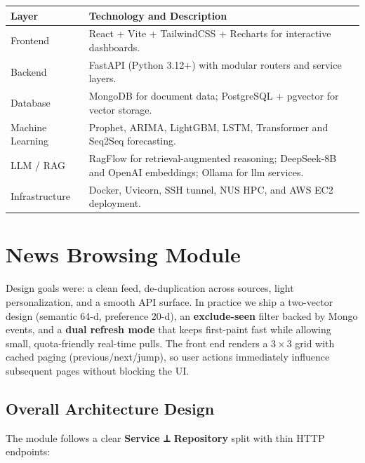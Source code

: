 \begin{longtable}{p{3cm}p{11cm}}
\toprule
\textbf{Layer} & \textbf{Technology and Description} \\
\midrule
Frontend & React + Vite + TailwindCSS + Recharts for interactive dashboards. \\
Backend & FastAPI (Python 3.12+) with modular routers and service layers. \\
Database & MongoDB for document data; PostgreSQL + pgvector for vector storage. \\
Machine Learning & Prophet, ARIMA, LightGBM, LSTM, Transformer and Seq2Seq forecasting. \\
LLM / RAG & RagFlow for retrieval-augmented reasoning; DeepSeek-8B and OpenAI embeddings; Ollama for llm services. \\
Infrastructure & Docker, Uvicorn, SSH tunnel, NUS \acs{HPC}, and AWS EC2 deployment. \\
\bottomrule
\end{longtable}




\section{News Browsing Module}

Design goals were: a clean feed, de-duplication across sources, light personalization, and a smooth API surface. In practice we ship a two-vector design (semantic 64-d, preference 20-d), an \textbf{exclude-seen} filter backed by Mongo events, and a \textbf{dual refresh mode} that keeps first-paint fast while allowing small, quota-friendly real-time pulls. The front end renders a \(3\times 3\) grid with cached paging (previous/next/jump), so user actions immediately influence subsequent pages without blocking the UI.

\subsection{Overall Architecture Design}
The module follows a clear \textbf{Service ⟂ Repository} split with thin HTTP endpoints:

